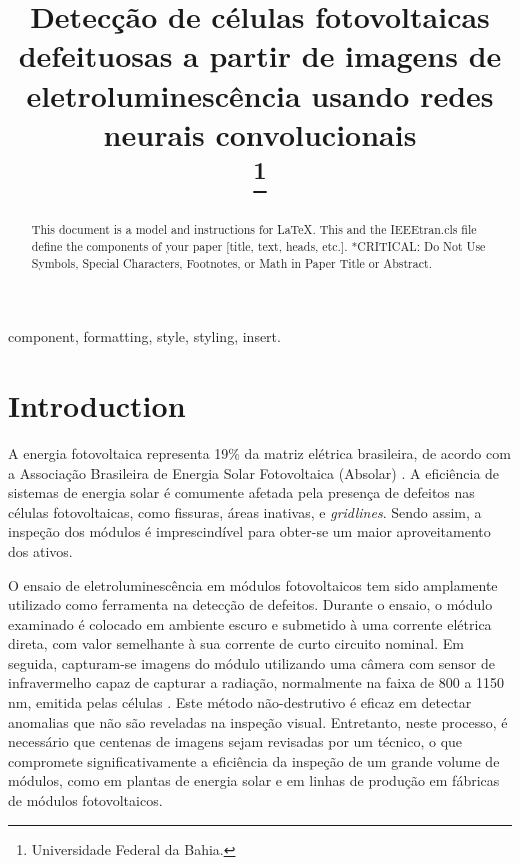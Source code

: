 \documentclass[conference]{IEEEtran}
\begin{document}
\title{Detecção de células fotovoltaicas defeituosas a partir de imagens de
    eletroluminescência usando redes neurais convolucionais\\
    \thanks{Universidade Federal da Bahia.}
}

\author{
}

\maketitle

\begin{abstract}
    This document is a model and instructions for \LaTeX.
    This and the IEEEtran.cls file define the components of your paper [title,
            text, heads, etc.]. *CRITICAL: Do Not Use Symbols, Special
    Characters,
    Footnotes,
    or Math in Paper Title or Abstract.
\end{abstract}

\begin{IEEEkeywords}
    component, formatting, style, styling, insert.
\end{IEEEkeywords}

\section{Introduction}
A energia fotovoltaica representa 19\% da matriz elétrica brasileira, de
acordo com a Associação Brasileira de Energia Solar Fotovoltaica (Absolar)
\cite{absolar2024}. A eficiência de sistemas de energia solar é comumente
afetada pela presença de defeitos nas células fotovoltaicas, como fissuras,
áreas inativas, e \textit{gridlines}. Sendo assim, a inspeção dos módulos
é imprescindível para obter-se um maior aproveitamento dos ativos.

O ensaio de eletroluminescência em módulos fotovoltaicos tem sido amplamente
utilizado como ferramenta na detecção de
defeitos. Durante o ensaio, o módulo examinado é colocado em ambiente escuro e
submetido à uma corrente elétrica direta, com valor semelhante à sua corrente
de curto circuito nominal.  Em seguida, capturam-se imagens do módulo
utilizando uma câmera com sensor de infravermelho capaz de capturar a radiação,
normalmente na faixa de 800 a 1150 nm, emitida pelas células
\cite{Frazao20177}. Este método não-destrutivo é eficaz em detectar anomalias
que não são reveladas na inspeção visual. Entretanto, neste processo,
é necessário que centenas de imagens sejam revisadas por um técnico, o que
compromete significativamente a eficiência da inspeção de um grande volume de
módulos, como em plantas de energia solar e em linhas de produção em fábricas
de módulos fotovoltaicos.
\end{document}
